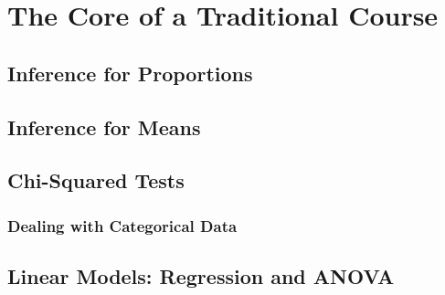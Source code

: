 

\chapter{The Core of a Traditional Course}




\section{Inference for Proportions}

\section{Inference for Means}

\section{Chi-Squared Tests}

\subsection{Dealing with Categorical Data}

\section{Linear Models: Regression and ANOVA}
